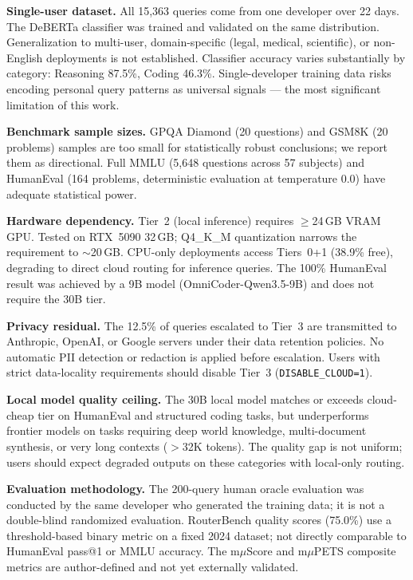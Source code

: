 \documentclass[11pt]{article}
\begin{document}
\textbf{Single-user dataset.} All 15,363 queries come from one developer
over 22 days. The DeBERTa classifier was trained and validated on the
same distribution. Generalization to multi-user, domain-specific
(legal, medical, scientific), or non-English deployments is not
established. Classifier accuracy varies substantially by category:
Reasoning 87.5\%, Coding 46.3\%. Single-developer training data risks
encoding personal query patterns as universal signals --- the most
significant limitation of this work.

\textbf{Benchmark sample sizes.} GPQA Diamond (20 questions) and GSM8K
(20 problems) samples are too small for statistically robust conclusions;
we report them as directional. Full MMLU (5,648 questions across 57
subjects) and HumanEval (164 problems, deterministic evaluation at
temperature 0.0) have adequate statistical power.

\textbf{Hardware dependency.} Tier~2 (local inference) requires
$\geq$24\,GB VRAM GPU. Tested on RTX~5090 32\,GB; Q4\_K\_M
quantization narrows the requirement to $\sim$20\,GB. CPU-only
deployments access Tiers~0+1 (38.9\% free), degrading to direct cloud
routing for inference queries. The 100\% HumanEval result was achieved
by a 9B model (OmniCoder-Qwen3.5-9B) and does not require the 30B tier.

\textbf{Privacy residual.} The 12.5\% of queries escalated to Tier~3
are transmitted to Anthropic, OpenAI, or Google servers under their data
retention policies. No automatic PII detection or redaction is applied
before escalation. Users with strict data-locality requirements should
disable Tier~3 (\texttt{DISABLE\_CLOUD=1}).

\textbf{Local model quality ceiling.} The 30B local model matches or
exceeds cloud-cheap tier on HumanEval and structured coding tasks, but
underperforms frontier models on tasks requiring deep world knowledge,
multi-document synthesis, or very long contexts ($>$32K tokens). The
quality gap is not uniform; users should expect degraded outputs on
these categories with local-only routing.

\textbf{Evaluation methodology.} The 200-query human oracle evaluation
was conducted by the same developer who generated the training data; it
is not a double-blind randomized evaluation. RouterBench quality scores
(75.0\%) use a threshold-based binary metric on a fixed 2024 dataset;
not directly comparable to HumanEval pass@1 or MMLU accuracy. The
m$\mu$Score and m$\mu$PETS composite metrics are author-defined and not
yet externally validated.
\end{document}

